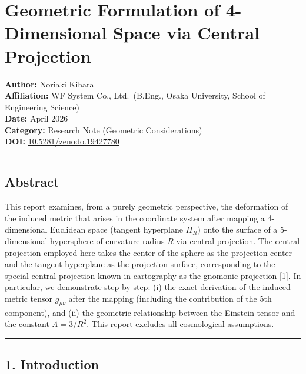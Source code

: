 \documentclass[a4paper,11pt]{article}
\theoremstyle{definition}
\begin{document}
\section{Geometric Formulation of 4-Dimensional Space via Central Projection}\label{geometric-formulation-of-4-dimensional-space-via-central-projection}

\textbf{Author:} Noriaki Kihara\\
\textbf{Affiliation:} WF System Co., Ltd.~(B.Eng., Osaka University, School of Engineering Science)\\
\textbf{Date:} April 2026\\
\textbf{Category:} Research Note (Geometric Considerations)\\
\textbf{DOI:} \href{https://doi.org/10.5281/zenodo.19427780}{10.5281/zenodo.19427780}

\begin{center}\rule{0.5\linewidth}{0.5pt}\end{center}

\subsection{Abstract}\label{abstract}

This report examines, from a purely geometric perspective, the deformation of the induced metric that arises in the coordinate system after mapping a 4-dimensional Euclidean space (tangent hyperplane \(\Pi_R\)) onto the surface of a 5-dimensional hypersphere of curvature radius \(R\) via central projection. The central projection employed here takes the center of the sphere as the projection center and the tangent hyperplane as the projection surface, corresponding to the special central projection known in cartography as the gnomonic projection {[}1{]}. In particular, we demonstrate step by step: (i) the exact derivation of the induced metric tensor \(g_{\mu\nu}\) after the mapping (including the contribution of the 5th component), and (ii) the geometric relationship between the Einstein tensor and the constant \(\Lambda = 3/R^2\). This report excludes all cosmological assumptions.

\begin{center}\rule{0.5\linewidth}{0.5pt}\end{center}

\subsection{1. Introduction}\label{introduction}
\end{document}
